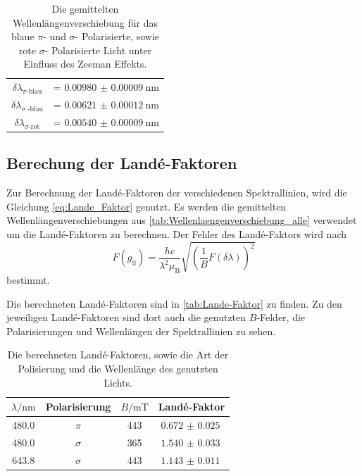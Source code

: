 \begin{table}
    \centering
    \caption{Die gemittelten Wellenlängenverschiebung für das blaue $\pi$- und $\sigma$- Polarisierte, sowie rote $\sigma$- Polarisierte Licht unter Einfluss des Zeeman Effekts.}
    \begin{tabular}{cc}
        \midrule
        $\delta \lambda _\text{$\pi$-blau}$ &= $\SI{0.00980(9)}{\nano\meter}$ \\
        $\delta \lambda _\text{$\sigma$ -blau}$ &= $\SI{0.00621(012)}{\nano\meter}$ \\
        $\delta \lambda _\text{$\sigma$-rot}$ &=  $\SI{0.00540(9)}{\nano\meter}$ \\
        \bottomrule
    \end{tabular}
    \label{tab:Wellenlaengenverschiebung_alle}
\end{table}

\subsection{Berechung der Landé-Faktoren}

Zur Berechnung der Landé-Faktoren der verschiedenen Spektrallinien, wird die Gleichung \eqref{eq:Lande_Faktor} genutzt.
Es werden die gemittelten Wellenlängenverschiebungen aus \autoref{tab:Wellenlaengenverschiebung_alle} verwendet um die Landé-Faktoren zu berechnen.
Der Fehler des Landé-Faktors wird nach
\begin{equation*}
    F(g_\text{ij}) = \frac{hc}{\lambda^2 \mu _\text{B}} \sqrt{\left ( \frac{1}{B} F(\delta \lambda) \right)^2}
\end{equation*}
bestimmt.

Die berechneten Landé-Faktoren sind in \autoref{tab:Lande-Faktor} zu finden.
Zu den jeweiligen Landé-Faktoren sind dort auch die genutzten $B$-Felder, die Polarisierungen und Wellenlängen der Spektrallinien zu sehen.

\begin{table}
    \centering
    \caption{Die berechneten Landé-Faktoren, sowie die Art der Polisierung und die Wellenlänge des genutzten Lichts.}
    \begin{tabular}{cccc}
        \toprule
        $\lambda / \si{\nano\meter}$ & Polarisierung & $B / \si{\milli\tesla}$ & Landé-Faktor \\
        \midrule
        480.0 & $\pi$ & 443 & $\SI{0.672(25)}{}$ \\
        480.0 & $\sigma$ & 365 & $\SI{1.540(33)}{}$ \\
        643.8 & $\sigma$ & 443 & $\SI{1.143(11)}{}$ \\
        \bottomrule
    \end{tabular}
    \label{tab:Lande-Faktor}
\end{table}

